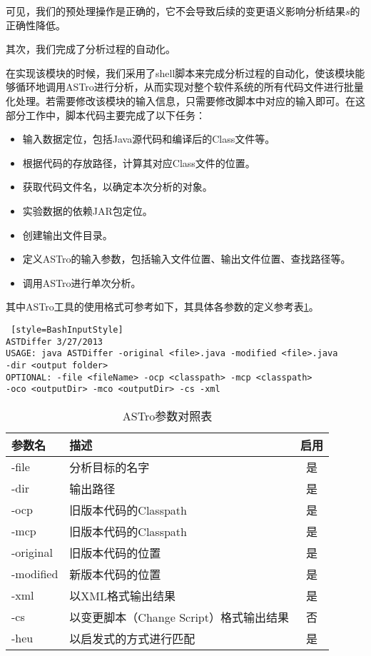 可见，我们的预处理操作是正确的，它不会导致后续的变更语义影响分析结果$s$的正确性降低。

其次，我们完成了分析过程的自动化。

在实现该模块的时候，我们采用了shell脚本来完成分析过程的自动化，使该模块能够循环地调用ASTro进行分析，从而实现对整个软件系统的所有代码文件进行批量化处理。若需要修改该模块的输入信息，只需要修改脚本中对应的输入即可。在这部分工作中，脚本代码主要完成了以下任务：

\begin{itemize}
	\item 输入数据定位，包括Java源代码和编译后的Class文件等。
	\item 根据代码的存放路径，计算其对应Class文件的位置。
	\item 获取代码文件名，以确定本次分析的对象。
	\item 实验数据的依赖JAR包定位。
	\item 创建输出文件目录。
	\item 定义ASTro的输入参数，包括输入文件位置、输出文件位置、查找路径等。
	\item 调用ASTro进行单次分析。
\end{itemize}

其中ASTro工具的使用格式可参考如下，其具体各参数的定义参考表\ref {ASTro}。

\begin{lstlisting} [style=BashInputStyle]
ASTDiffer 3/27/2013
USAGE: java ASTDiffer -original <file>.java -modified <file>.java 
-dir <output folder>
OPTIONAL: -file <fileName> -ocp <classpath> -mcp <classpath> 
-oco <outputDir> -mco <outputDir> -cs -xml
\end{lstlisting}	

\begin{table}[H]
	\caption{ASTro参数对照表}
	\label{ASTro}
	\centering
	\begin{tabular}{llc}
		\toprule[1.5pt] 
		{\heiti 参数名} & {\heiti 描述} & {\heiti 启用}\\\midrule[1pt]
		-file & 分析目标的名字 & 是 \\
		-dir & 输出路径 & 是 \\
		-ocp & 旧版本代码的Classpath & 是\\
		-mcp & 旧版本代码的Classpath & 是\\
		-original    & 旧版本代码的位置 & 是\\
		-modified   & 新版本代码的位置 & 是\\
		-xml   & 以XML格式输出结果 & 是\\
		-cs   & 以变更脚本（Change Script）格式输出结果 & 否\\
		-heu   & 以启发式的方式进行匹配 & 是\\
		\bottomrule[1.5pt]
	\end{tabular}	
\end{table}

